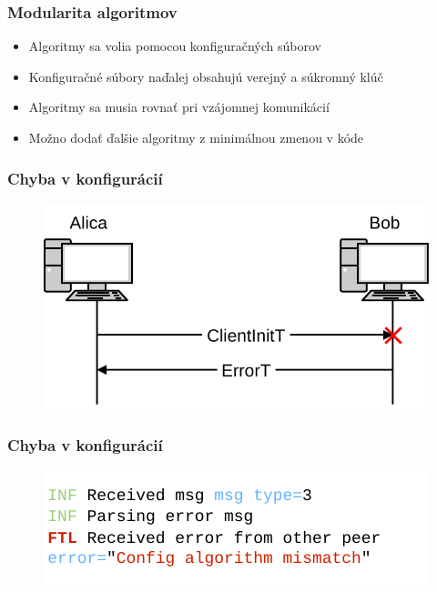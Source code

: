 \documentclass[%
  14pt,       				%
	t,                  %
	aspectratio=1610,   %
	unicode,						%
]{beamer}				    	%
\begin{document}
\begin{frame}[c]
	\frametitle{Modularita algoritmov}
	\large{\begin{itemize}
			\item Algoritmy sa volia pomocou konfiguračných súborov
			\item Konfiguračné súbory naďalej obsahujú verejný a súkromný klúč
			\item Algoritmy sa musia rovnať pri vzájomnej komunikácií
			\item Možno dodať ďalšie algoritmy z minimálnou zmenou v kóde
		\end{itemize}}
\end{frame}

\begin{frame}[c]
	\frametitle{Chyba v konfigurácií}
	\begin{figure}
		\includegraphics[width=\textwidth]{presentation_pictures/comm_err.pdf}
	\end{figure}
\end{frame}

\begin{frame}[c]
	\frametitle{Chyba v konfigurácií}
	\begin{figure}[htbp]
		\centering
		\includegraphics[width=\textwidth]{presentation_pictures/client_err.pdf}
	\end{figure}
\end{frame}
\end{document}
